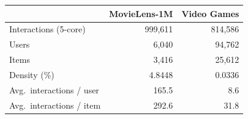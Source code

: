 \begin{tabular}{lrr}
\toprule
 & MovieLens-1M & Video Games \\
\midrule
Interactions (5-core) & 999,611 & 814,586 \\
Users & 6,040 & 94,762 \\
Items & 3,416 & 25,612 \\
Density (\%) & 4.8448 & 0.0336 \\
Avg.\ interactions / user & 165.5 & 8.6 \\
Avg.\ interactions / item & 292.6 & 31.8 \\
\bottomrule
\end{tabular}
